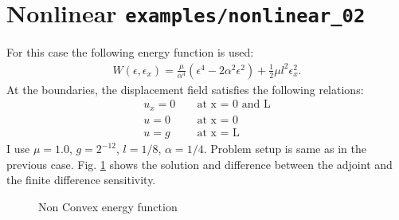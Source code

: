 \documentclass[%
notitlepage,
]{revtex4-1}
\begin{document}
\section{Nonlinear \texttt{examples/nonlinear\_02}}
For this case the following energy function is used:
\begin{eqnarray}
  W(\epsilon, \epsilon_x) = \frac{\mu}{\alpha^4}(\epsilon^4 - 2\alpha^2\epsilon^2) + \frac{1}{2}\mu l^2 \epsilon_x^2.
\end{eqnarray}
At the boundaries, the displacement field satisfies the following relations:
\begin{eqnarray}
  u_x = 0 &&\text{ at x = 0 and L}\\
  u = 0 &&\text{ at x = 0}\\
  u = g &&\text{ at x = L }
\end{eqnarray}
 I use $\mu = 1.0$, $g = 2^{-12}$, $l = 1/8$, $\alpha = 1/4$. Problem setup is same as in the previous case. Fig. \ref{fig:nonconvex:1} shows the solution and difference between the adjoint and the finite difference sensitivity.
\begin{figure}[!h]
    \caption{Non Convex energy function}
    \label{fig:nonconvex:1}
\end{figure}
\end{document}

